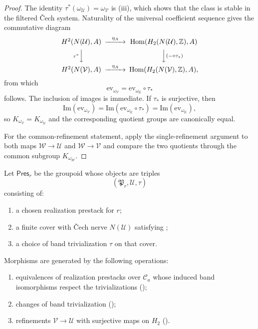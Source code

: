 \begin{proof}
The identity $\tau^*(\omega_{\mathcal U})=\omega_{\mathcal V}$ is (iii), which shows that the class is stable in the filtered \v{C}ech system. Naturality of the universal coefficient sequence gives the commutative diagram
\[
\begin{CD}
H^2(N(\mathcal U),A) @>\eta_A>> \mathrm{Hom}(H_2(N(\mathcal U),\mathbb Z),A) \\
@V\tau^*VV @VV(-\circ\tau_*)V \\
H^2(N(\mathcal V),A) @>\eta_A>> \mathrm{Hom}(H_2(N(\mathcal V),\mathbb Z),A),
\end{CD}
\]
from which
\[
\mathrm{ev}_{\omega_{\mathcal V}}=\mathrm{ev}_{\omega_{\mathcal U}}\circ\tau_*
\]
follows. The inclusion of images is immediate. If $\tau_*$ is surjective, then
\[
\mathrm{Im}(\mathrm{ev}_{\omega_{\mathcal V}})
=
\mathrm{Im}(\mathrm{ev}_{\omega_{\mathcal U}}\circ\tau_*)
=
\mathrm{Im}(\mathrm{ev}_{\omega_{\mathcal U}}),
\]
so $K_{\omega_{\mathcal V}}=K_{\omega_{\mathcal U}}$ and the corresponding quotient groups are canonically equal.

For the common-refinement statement, apply the single-refinement argument to both maps $\mathcal W\to\mathcal U$ and $\mathcal W\to\mathcal V$ and compare the two quotients through the common subgroup $K_{\omega_{\mathcal W}}$.
\end{proof}

\begin{definition}\label{def:presentation-groupoid}
Let $\mathsf{Pres}_r$ be the groupoid whose objects are triples
\[
(\mathfrak P_r,\mathcal U,\tau)
\]
consisting of:
\begin{enumerate}[label=(\roman*),nosep]
\item a chosen realization prestack for $r$;
\item a finite cover with \v{C}ech nerve $N(\mathcal U)$ satisfying ;
\item a choice of band trivialization $\tau$ on that cover.
\end{enumerate}
Morphisms are generated by the following operations:
\begin{enumerate}[label=(\alph*),nosep]
\item equivalences of realization prestacks over $\mathcal C_a$ whose induced band isomorphisms respect the trivializations ();
\item changes of band trivialization ();
\item refinements $\mathcal V\to \mathcal U$ with surjective maps on $H_2$ ().
\end{enumerate}
\end{definition}

